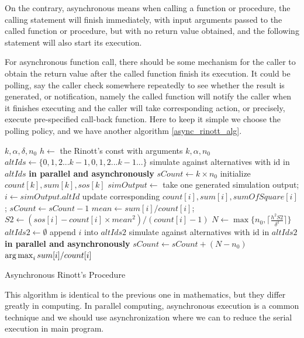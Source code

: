 On the contrary, asynchronous means when calling a function or procedure, the calling statement will finish immediately, with input arguments passed to the called function or procedure, but with no return value obtained, and the following statement will also start its execution.

For asynchronous function call, there should be some mechanism for the caller to obtain the return value after the called function finish its execution. It could be polling, say the caller check somewhere repeatedly to see whether the result is generated, or notification, namely the called function will notify the caller when it finishes executing and the caller will take corresponding action, or precisely, execute pre-specified call-back function. Here to keep it simple we choose the polling policy, and we have another algorithm \ref{async_rinott_alg}.

\begin{algorithm}
\begin{algorithmic}[1]
\Require $k, \alpha, \delta, n_0$
\State $h \gets$ the Rinott's const with arguments $k, \alpha, n_0$
\State $altIds \gets \{0, 1, 2...k - 1, 0, 1, 2...k - 1...\}$ 
\State simulate against alternatives with id in $altIds$ \textbf{in parallel and asynchronously}
\State $sCount \gets k \times n_0$ 
\State initialize $count[k], sum[k], sos[k]$ 
  \State $simOutput \gets $ take one generated simulation output; $i \gets simOutput.altId$
  \State update corresponding $count[i], sum[i], sumOfSquare[i]$; $sCount \gets sCount - 1$
	\State $mean \gets sum[i] / count[i]$; $S2 \gets (sos[i] - count[i] \times mean^2) / (count[i] - 1)$ \State $N \gets \max\{n_0, \lceil \frac{h^2S2}{\delta^2} \rceil\}$
	  \State $altIds2 \gets \emptyset$
        \State append $i$ into $altIds2$
      \EndFor
	  \State simulate against alternatives with id in $altIds2$ \textbf{in parallel and asynchronously}
	  \State $sCount \gets sCount + (N - n_0)$
	\EndIf
  \EndIf
\EndWhile
\State \Return $\operatorname*{arg\,max}_{i} sum[i] / count[i]$
\end{algorithmic}
\caption{Asynchronous Rinott's Procedure}
\label{async_rinott_alg}
\end{algorithm}

This algorithm is identical to the previous one in mathematics, but they differ greatly in computing. In parallel computing, asynchronous execution is a common technique and we should use asynchronization where we can to reduce the serial execution in main program.

